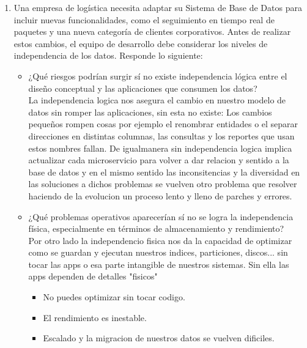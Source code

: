 \documentclass[12pt]{report}
\begin{document}
\begin{enumerate}[label=\textbf{\arabic*.}, leftmargin=*]
\begin{enumerate}[label=\textbf{\alph*.}, leftmargin=*, itemsep=1.0em]
\textbf{Recomendación}
Por lo que para una empresa en crecimiento que busca centralizar operaciones de ventas, clientes, inventario y logística, la mejor opción es \textbf{PostgreSQL}, ya que ofrece mayor capacidad de escalabilidad, solidez en el manejo de datos complejos y ausencia de costos de versiones empresariales o licencias. Por que hay que tener en cuenta que MySQL es adecuado para proyectos pequeños o con requerimientos menos complejos, pero PostgreSQL proporciona una base más robusta y preparada para el crecimiento a largo plazo.






\item Una empresa de log\'istica necesita adaptar su Sistema de Base de Datos para incluir nuevas funcionalidades, como el seguimiento en tiempo real de paquetes y una nueva categor\'ia de clientes corporativos. Antes de realizar estos cambios, el equipo de desarrollo debe considerar los niveles de independencia de los datos. Responde lo siguiente:
\begin{itemize}
  \item ¿Qu\'e riesgos podr\'ian surgir s\'i no existe independencia l\'ogica entre el dise\~no conceptual y las aplicaciones que consumen los datos?\\
  
        La independencia logica nos asegura el cambio en nuestro modelo de datos sin romper las aplicaciones, sin esta no existe:
        Los cambios pequeños rompen cosas por ejemplo el renombrar entidades o el separar direcciones en distintas columnas, las consultas y los reportes que usan estos nombres fallan.
        De igualmanera sin independencia logica implica actualizar cada microservicio para volver a dar relacion y sentido a la base de datos y en el mismo sentido las inconsitencias y la diversidad en las soluciones a dichos problemas se vuelven otro problema que resolver haciendo de la evolucion un proceso lento y lleno de parches y errores.\\
        
  
  \item ¿Qu\'e problemas operativos aparecer\'ian s\'i no se logra la independencia f\'isica, especialmente en t\'erminos de almacenamiento y rendimiento?\\

        Por otro lado la independencio fisica nos da la capacidad de optimizar como se guardan y ejecutan nuestros indices, particiones, discos... sin tocar las apps o esa parte intangible de nuestros sistemas. Sin ella las apps dependen de detalles "fisicos"
        \begin{itemize}
            \item No puedes optimizar sin tocar codigo.
            \item El rendimiento es inestable.
            \item Escalado y la migracion de nuestros datos se vuelven dificiles.\\
        \end{itemize}


\end{itemize}
\end{enumerate}
\end{enumerate}
\end{document}
